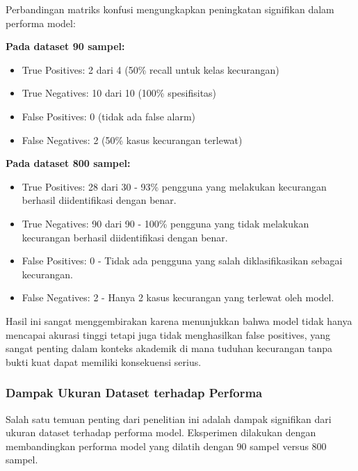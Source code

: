 Perbandingan matriks konfusi mengungkapkan peningkatan signifikan dalam performa model:

\textbf{Pada dataset 90 sampel:}
\begin{itemize}
    \item True Positives: 2 dari 4 (50\% recall untuk kelas kecurangan)
    \item True Negatives: 10 dari 10 (100\% spesifisitas)
    \item False Positives: 0 (tidak ada false alarm)
    \item False Negatives: 2 (50\% kasus kecurangan terlewat)
\end{itemize}

\textbf{Pada dataset 800 sampel:}
\begin{itemize}
    \item True Positives: 28 dari 30 - 93\% pengguna yang melakukan kecurangan berhasil diidentifikasi dengan benar.
    \item True Negatives: 90 dari 90 - 100\% pengguna yang tidak melakukan kecurangan berhasil diidentifikasi dengan benar.
    \item False Positives: 0 - Tidak ada pengguna yang salah diklasifikasikan sebagai kecurangan.
    \item False Negatives: 2 - Hanya 2 kasus kecurangan yang terlewat oleh model.
\end{itemize}

Hasil ini sangat menggembirakan karena menunjukkan bahwa model tidak hanya mencapai akurasi tinggi tetapi juga tidak menghasilkan false positives, yang sangat penting dalam konteks akademik di mana tuduhan kecurangan tanpa bukti kuat dapat memiliki konsekuensi serius.

\subsubsection{Dampak Ukuran Dataset terhadap Performa}

Salah satu temuan penting dari penelitian ini adalah dampak signifikan dari ukuran dataset terhadap performa model. Eksperimen dilakukan dengan membandingkan performa model yang dilatih dengan 90 sampel versus 800 sampel.

